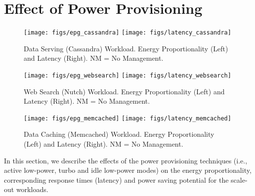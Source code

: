 \documentclass{sig-alternate}
\begin{document}
 \section{Effect of Power Provisioning}
\label{sec:eprop}

\begin{figure*}[t!]
\begin{minipage}[b]{1.0\linewidth}
\centering
\texttt{[image: figs/epg\_cassandra]}
\texttt{[image: figs/latency\_cassandra]}
\caption{Data Serving (Cassandra) Workload. 
Energy Proportionality (Left) and Latency (Right). NM = No Management.}
\label{fig:epac}
\end{minipage}

\begin{minipage}[b]{1.0\linewidth}
\centering
\texttt{[image: figs/epg\_websearch]}
\texttt{[image: figs/latency\_websearch]}
\caption{Web Search (Nutch) Workload. 
Energy Proportionality (Left) and Latency (Right). NM = No Management.}
\label{fig:epws}
\end{minipage}

\begin{minipage}[b]{1.0\linewidth}
\centering
\texttt{[image: figs/epg\_memcached]}
\texttt{[image: figs/latency\_memcached]}
\caption{Data Caching (Memcached) Workload. 
Energy Proportionality (Left) and Latency (Right). NM = No Management.}
\label{fig:epmc}
\end{minipage}
\end{figure*}


In this section, we describe the effects of the power provisioning 
techniques (i.e., active low-power, turbo and idle low-power modes) on the 
energy proportionality, corresponding response times (latency) and power saving 
potential for the scale-out workloads. 
\end{document}
